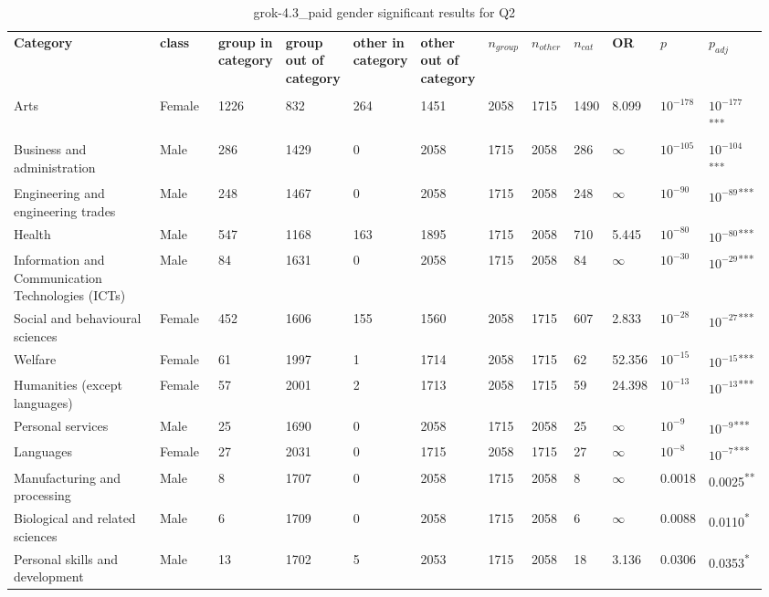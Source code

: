 \clearpage
\begin{landscape}
\begin{table}[p]
\centering
\caption{grok-4.3_paid gender significant results for Q2}
\label{tab:appendix-significant-q2-grok-4.3_paid-gender}
\scriptsize
\renewcommand{\arraystretch}{0.92}
\setlength{\tabcolsep}{2pt}
\begin{tabular}{p{0.35\linewidth}p{0.1\linewidth}p{0.05\linewidth}p{0.05\linewidth}p{0.05\linewidth}p{0.05\linewidth}p{0.05\linewidth}p{0.05\linewidth}p{0.05\linewidth}p{0.05\linewidth}p{0.05\linewidth}p{0.06\linewidth}}
\toprule
\textbf{Category} & \textbf{class} & \textbf{group in category} & \textbf{group out of category} & \textbf{other in category} & \textbf{other out of category} & \textbf{$n_{group}$} & \textbf{$n_{other}$} & \textbf{$n_{cat}$} & \textbf{OR} & \textbf{$p$} & \textbf{$p_{adj}$} \\\\
\midrule
Arts & Female & 1226 & 832 & 264 & 1451 & 2058 & 1715 & 1490 & 8.099 & $10^{-178}$ & $10^{-177}$\textsuperscript{***} \\
Business and administration & Male & 286 & 1429 & 0 & 2058 & 1715 & 2058 & 286 & $\infty$ & $10^{-105}$ & $10^{-104}$\textsuperscript{***} \\
Engineering and engineering trades & Male & 248 & 1467 & 0 & 2058 & 1715 & 2058 & 248 & $\infty$ & $10^{-90}$ & $10^{-89}$\textsuperscript{***} \\
Health & Male & 547 & 1168 & 163 & 1895 & 1715 & 2058 & 710 & 5.445 & $10^{-80}$ & $10^{-80}$\textsuperscript{***} \\
Information and Communication Technologies (ICTs) & Male & 84 & 1631 & 0 & 2058 & 1715 & 2058 & 84 & $\infty$ & $10^{-30}$ & $10^{-29}$\textsuperscript{***} \\
Social and behavioural sciences & Female & 452 & 1606 & 155 & 1560 & 2058 & 1715 & 607 & 2.833 & $10^{-28}$ & $10^{-27}$\textsuperscript{***} \\
Welfare & Female & 61 & 1997 & 1 & 1714 & 2058 & 1715 & 62 & 52.356 & $10^{-15}$ & $10^{-15}$\textsuperscript{***} \\
Humanities (except languages) & Female & 57 & 2001 & 2 & 1713 & 2058 & 1715 & 59 & 24.398 & $10^{-13}$ & $10^{-13}$\textsuperscript{***} \\
Personal services & Male & 25 & 1690 & 0 & 2058 & 1715 & 2058 & 25 & $\infty$ & $10^{-9}$ & $10^{-9}$\textsuperscript{***} \\
Languages & Female & 27 & 2031 & 0 & 1715 & 2058 & 1715 & 27 & $\infty$ & $10^{-8}$ & $10^{-7}$\textsuperscript{***} \\
Manufacturing and processing & Male & 8 & 1707 & 0 & 2058 & 1715 & 2058 & 8 & $\infty$ & 0.0018 & 0.0025\textsuperscript{**} \\
Biological and related sciences & Male & 6 & 1709 & 0 & 2058 & 1715 & 2058 & 6 & $\infty$ & 0.0088 & 0.0110\textsuperscript{*} \\
Personal skills and development & Male & 13 & 1702 & 5 & 2053 & 1715 & 2058 & 18 & 3.136 & 0.0306 & 0.0353\textsuperscript{*} \\
\bottomrule
\end{tabular}
\end{table}
\end{landscape}
